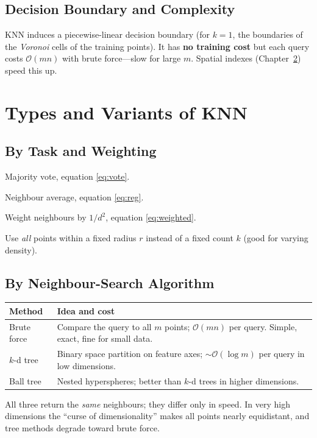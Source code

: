 \documentclass[11pt,a4paper]{report}
\theoremstyle{definition}
\theoremstyle{remark}
\begin{document}
	\section{Decision Boundary and Complexity}
	KNN induces a piecewise-linear decision boundary (for $k=1$, the boundaries of
	the \emph{Voronoi} cells of the training points). It has \textbf{no training
		cost} but each query costs $\mathcal{O}(mn)$ with brute force---slow for large
	$m$. Spatial indexes (Chapter~\ref{ch:types}) speed this up.
	
	\chapter{Types and Variants of KNN}
	\label{ch:types}
	
	\section{By Task and Weighting}
	\begin{description}[leftmargin=0pt,itemsep=3pt]
		\item[\textbf{KNN classification.}] Majority vote, equation \eqref{eq:vote}.
		\item[\textbf{KNN regression.}] Neighbour average, equation \eqref{eq:reg}.
		\item[\textbf{Distance-weighted KNN.}] Weight neighbours by $1/d^2$,
		equation \eqref{eq:weighted}.
		\item[\textbf{Radius-neighbours.}] Use \emph{all} points within a fixed radius
		$r$ instead of a fixed count $k$ (good for varying density).
	\end{description}
	
	\section{By Neighbour-Search Algorithm}
	\begin{center}
		\begin{tabular}{@{}lp{9.2cm}@{}}
			\toprule
			Method & Idea and cost\\
			\midrule
			Brute force & Compare the query to all $m$ points; $\mathcal{O}(mn)$ per query.
			Simple, exact, fine for small data.\\
			$k$-d tree & Binary space partition on feature axes; $\sim\mathcal{O}(\log m)$
			per query in low dimensions.\\
			Ball tree & Nested hyperspheres; better than $k$-d trees in higher dimensions.\\
			\bottomrule
		\end{tabular}
	\end{center}
	All three return the \emph{same} neighbours; they differ only in speed. In very
	high dimensions the ``curse of dimensionality'' makes all points nearly
	equidistant, and tree methods degrade toward brute force.
	
\end{document}
